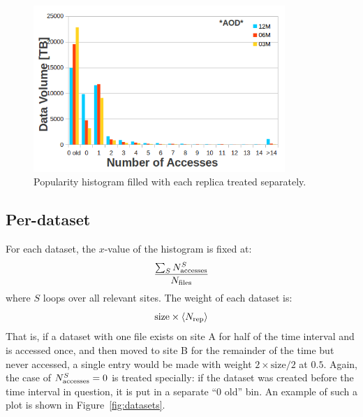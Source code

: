 \begin{figure}[htpb]
  \begin{center}
    \includegraphics[width=0.85\textwidth]{plots/per_replica.png}
  \end{center}
  \caption{Popularity histogram filled with each replica treated separately.}  
  \label{fig:replicas}
\end{figure}


\subsection{Per-dataset}

For each dataset, the $x$-value of the histogram is fixed at:
%
\begin{equation}
  \frac{\sum_SN_\text{accesses}^S}{N_\mathrm{files}}
\end{equation}
where $S$ loops over all relevant sites.
%
The weight of each dataset is:
\begin{equation}
  \mathrm{size} \times \langle N_\text{rep}\rangle
\end{equation}
That is, if a dataset with one file exists on site A for half of the time interval 
and is accessed once, and then moved to site B for the remainder of the time but 
never accessed, a single entry would be made with weight $2\times\mathrm{size}/2$ 
at $0.5$. Again, the case of $N_\text{accesses}^S=0$ is treated specially: if the dataset
was created before the time interval in question, it is put in a separate
``0 old'' bin.
An example of such a plot is shown in Figure~\ref{fig:datasets}.

